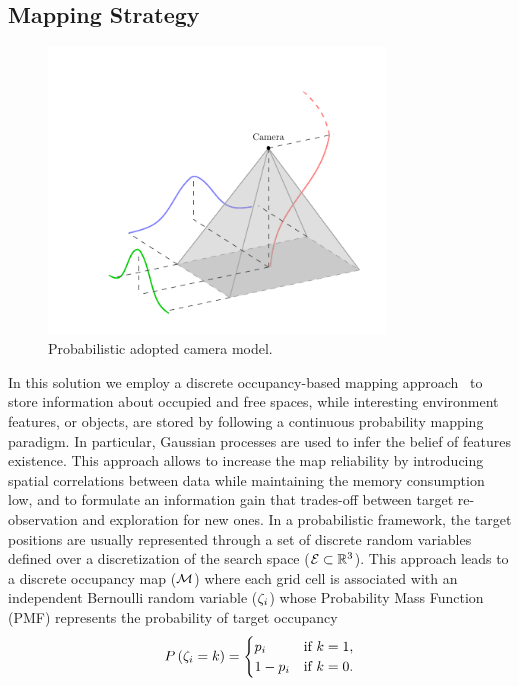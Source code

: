 \subsection{Mapping Strategy}%
\label{SEC:SEARCH-MAP-STRATEGY}
\begin{figure}[!t]
	\centering
	\includegraphics[width=0.8\textwidth]{Figs/Chapter4/camera_fov.pdf}
	\caption{Probabilistic adopted camera model.}
	\label{FIG:SEARCH-CAMERA-MODEL}
\end{figure}
In this solution we employ a discrete occupancy-based mapping approach~\cite{hornung2013octomap} to store information about occupied
and free spaces, while interesting environment features, or objects, are stored by following a continuous probability mapping paradigm.
In particular, Gaussian processes are used to infer the belief of features existence. This approach allows to increase the map
reliability by introducing spatial correlations between data while maintaining the memory consumption low, and to formulate an information
gain that trades-off between target re-observation and exploration for new ones.
In a probabilistic framework, the target positions are usually represented through a set of discrete random variables defined over a
discretization of the search space ($\mathcal{E} \subset \mathbb{R}^3$). This approach leads to a discrete occupancy map ($\mathcal{M}$) where each grid cell is associated with
an independent Bernoulli random variable ($\zeta_i$) whose Probability Mass Function (PMF) represents the probability of target
occupancy~\cite{popovic2020informative}
\begin{equation*}
	P \left( \zeta_i = k \right) =
	\begin{cases}
		p_i &\text{if } k=1, \\
		1 - p_i &\text{if } k=0.
	\end{cases}
\end{equation*}
